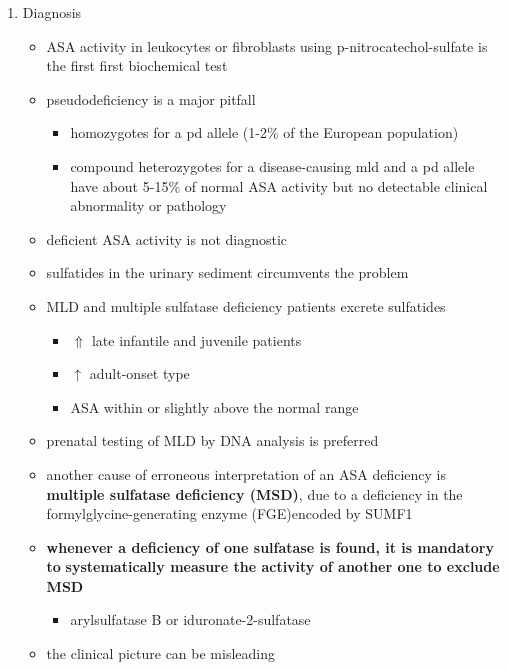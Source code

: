 \documentclass{scrartcl}
\begin{document}
\begin{enumerate}
\item Diagnosis
\label{sec:org4a1d5c9}

\begin{itemize}
\item ASA activity in leukocytes or fibroblasts using p-nitrocatechol-sulfate is the first first biochemical test
\item pseudodeficiency is a major pitfall
\begin{itemize}
\item homozygotes for a pd allele (1-2\% of the European population)
\item compound heterozygotes for a disease-causing mld and a pd allele
have about 5-15\% of normal ASA activity but no detectable clinical
abnormality or pathology
\end{itemize}
\item deficient ASA activity is not diagnostic
\item sulfatides in the urinary sediment circumvents the problem
\item MLD and multiple sulfatase deficiency patients excrete sulfatides
\begin{itemize}
\item \(\Uparrow\) late infantile and juvenile patients
\item \(\uparrow\) adult-onset type
\item ASA within or slightly above the normal range
\end{itemize}

\item prenatal testing of MLD by DNA analysis is preferred

\item another cause of erroneous interpretation of an ASA deficiency is
\textbf{multiple sulfatase deficiency (MSD)}, due to a deficiency in the
formylglycine-generating enzyme (FGE)encoded by SUMF1

\item \textbf{whenever a deficiency of one sulfatase is found, it is mandatory to}
\textbf{systematically measure the activity of another one to exclude MSD}
\begin{itemize}
\item arylsulfatase B or iduronate-2-sulfatase
\end{itemize}
\item the clinical picture can be misleading


\end{itemize}
\end{enumerate}
\end{document}

